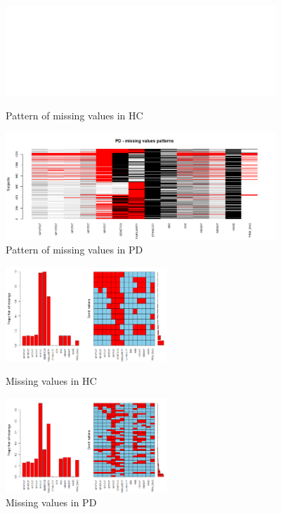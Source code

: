 \documentclass[]{article}
\begin{document}
\begin{figure}[h]

	\centering
	\includegraphics[width=4in]{../missing_patterns_HC}
	\caption{Pattern of missing values in HC}
	\label{fig:missing_patterns_HC}

	\centering
	\includegraphics[width=4in]{../missing_patterns_PD}
	\caption{Pattern of missing values in PD}
	\label{fig:missing_patterns_PD}
	
\end{figure} 
\begin{figure}[h]
	\centering
	\includegraphics[width=2.4in]{../HC_missing_values}
	\caption{Missing values in HC}
	\label{fig:HC_missing_values}
	
	\centering
	\includegraphics[width=2.4in]{../PD_missing_values}
	\caption{Missing values in PD}
	\label{fig:PD_missing_values}

\end{figure} 
\end{document}
